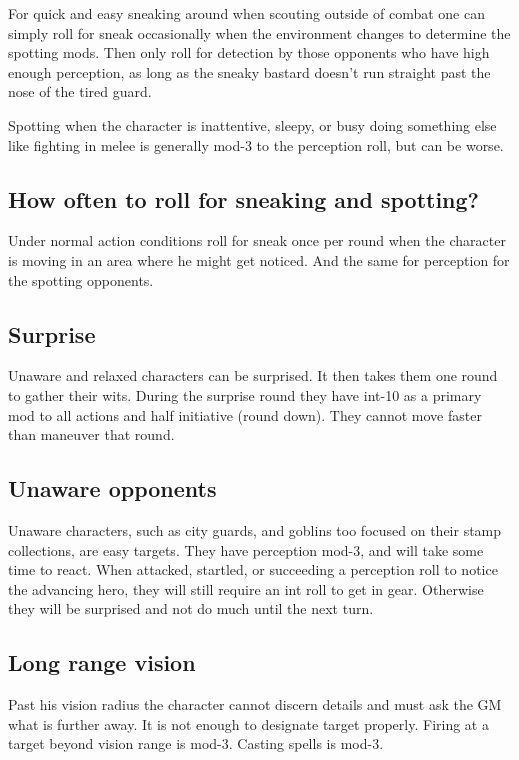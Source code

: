 For quick and easy sneaking around when scouting outside of combat one can simply roll for sneak occasionally when the environment changes to determine the spotting mods. Then only roll for detection by those opponents who have high enough perception, as long as the sneaky bastard doesn't run straight past the nose of the tired guard.

Spotting when the character is inattentive, sleepy, or busy doing something else like fighting in melee is generally mod-3 to the perception roll, but can be worse.


\subsection*{How often to roll for sneaking and spotting?}
Under normal action conditions roll for sneak once per round when the character is moving in an area where he might get noticed. And the same for perception for the spotting opponents.


\subsection*{Surprise}
Unaware and relaxed characters can be surprised. It then takes them one round to gather their wits. During the surprise round they have int-10 as a primary mod to all actions and half initiative (round down). They cannot move faster than maneuver that round.


\subsection*{Unaware opponents}
Unaware characters, such as city guards, and goblins too focused on their stamp collections, are easy targets. They have perception mod-3, and will take some time to react. When attacked, startled, or succeeding a perception roll to notice the advancing hero, they will still require an int roll to get in gear. Otherwise they will be surprised and not do much until the next turn.


\subsection*{Long range vision}
Past his vision radius the character cannot discern details and must ask the GM what is further away. It is not enough to designate target properly. Firing at a target beyond vision range is mod-3. Casting spells is mod-3.


